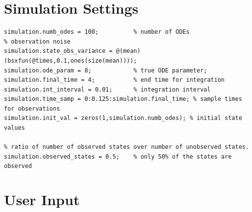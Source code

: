 \section{Simulation Settings}

\color{RoyalPurple}\begin{verbatim}
simulation.numb_odes = 100;          % number of ODEs
% observation noise
simulation.state_obs_variance = @(mean)(bsxfun(@times,0.1,ones(size(mean))));
simulation.ode_param = 8;            % true ODE parameter;
simulation.final_time = 4;           % end time for integration
simulation.int_interval = 0.01;      % integration interval
simulation.time_samp = 0:0.125:simulation.final_time; % sample times for observations
simulation.init_val = zeros(1,simulation.numb_odes); % initial state values

% ratio of number of observed states over number of unobserved states.
simulation.observed_states = 0.5;    % only 50% of the states are observed
\end{verbatim}
\color{black}


\section{User Input}

